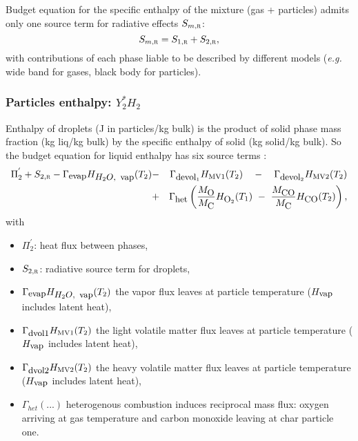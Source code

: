 Budget equation for the specific enthalpy of the mixture (gas + particles)
admits only one source term for radiative effects
$S_{m,\mbox{\scriptsize\textsc{r}}}$:
\begin{equation}
    S_{m,\mbox{\scriptsize\textsc{r}}}= S_{1,\mbox{\scriptsize\textsc{r}}}+ S_{2,\mbox{\scriptsize\textsc{r}}},
\end{equation}
with contributions of each phase liable to be described by different models (\emph{e.g.} wide band for gases, black body for particles).

\subsubsection{Particles enthalpy: $Y_{2}^{*}H_{2}$ }

Enthalpy of droplets (J in particles/kg bulk) is the product of solid phase mass
fraction (kg liq/kg bulk) by the specific enthalpy of solid (kg solid/kg
bulk). So the budget equation for liquid enthalpy has six source terms :
\begin{eqnarray*}
\Pi_{2}^{'}+S_{2,\mbox{\scriptsize\textsc{r}}}-\Gamma_{\mbox{\small evap}}H_{\mbox{\small $H_{2}O$,\, vap}}(T_{2}) & - & \Gamma_{\mbox{\small devol}_1}H_{\mbox{\scriptsize MV1}}(T_{2})\quad-\quad \Gamma_{\mbox{\small devol}_2}H_{\mbox{\scriptsize MV2}}(T_{2}) \\
                                                   & + &\Gamma_{\mbox{\small het}}\left( \dfrac{M_{\mbox{\small O}}}{M_{\mbox{\small C}}}H_{\mbox{\small O}_{2}}(T_{1})~ - ~\dfrac{M_{\mbox{\small CO}}}{M_{\mbox{\small C}}}H_{\mbox{\small CO}}(T_{2})\right), 
\end{eqnarray*}
with
\begin{itemize}
  \item $\Pi_{2}^{'}$: heat flux between phases,
  \item $S_{2,\mbox{\scriptsize\textsc{r}}}$: radiative source term for droplets,
  \item $\Gamma_{\mbox{\small evap}}H_{\mbox{\small $H_{2}O$, \,vap}}(T_{2})$ the vapor
    flux leaves at particle temperature ($H_{\mbox{\small vap}}$ includes latent
    heat),
  \item $\Gamma_{\mbox{\small dvol1}}H_{\mbox{\scriptsize MV1}}(T_{2})$ the
    light volatile matter flux leaves at particle temperature ($H_{\mbox{\small
        vap}}$ includes latent heat),
  \item $\Gamma_{\mbox{\small dvol2}}H_{\mbox{\scriptsize MV2}}(T_{2})$ the
    heavy volatile matter flux leaves at particle temperature ($H_{\mbox{\small
        vap}}$ includes latent heat),
  \item $\Gamma_{het}(...)$ heterogenous combustion induces reciprocal mass
    flux: oxygen arriving at gas temperature and carbon monoxide leaving at char
    particle one.
\end{itemize}


